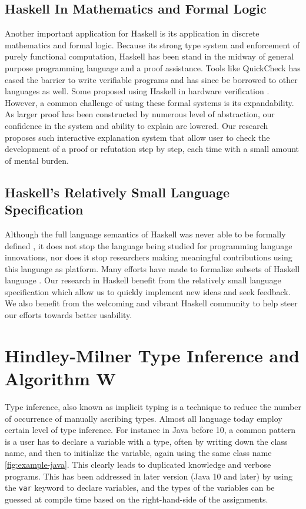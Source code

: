 \subsection{Haskell In Mathematics and Formal Logic}

Another important application for Haskell is its application in discrete mathematics and formal logic. Because its strong type system and enforcement of purely functional computation, Haskell has been stand in the midway of general purpose programming language and a proof assistance. Tools like QuickCheck \cite{Claessen2000-rl} has eased the barrier to write verifiable programs and has since be borrowed to other languages as well. Some proposed using Haskell in hardware verification \cite{Bjesse1998-lh}. However, a common challenge of using these formal systems is its expandability. As larger proof has been constructed by numerous level of abstraction, our confidence in the system and ability to explain are lowered. Our research proposes such interactive explanation system that allow user to check the development of a proof or refutation step by step, each time with a small amount of mental burden. 


\subsection{Haskell's Relatively Small Language Specification}

Although the full language semantics of Haskell was never able to be formally defined \cite{Hudak2007-kn}, it does not stop the language being studied for programming language innovations, nor does it stop researchers making meaningful contributions using this language as platform. Many efforts have made to formalize subsets of Haskell language \cite{FaxEn2002-nd}. Our research in Haskell benefit from the relatively small language specification which allow us to quickly implement new ideas and seek feedback.  We also benefit from the welcoming and vibrant Haskell community to help steer our efforts towards better usability. 




\section{Hindley-Milner Type Inference and Algorithm W}

Type inference, also known as implicit typing is a technique to reduce the number of occurrence of manually ascribing types. Almost all language today employ certain level of type inference. For instance in Java before 10, a common pattern is a user has to declare a variable with a type, often by writing down the class name, and then to initialize the variable, again using the same class name \ref{fig:example-java}. This clearly leads to duplicated knowledge and verbose programs. This has been addressed in later version (Java 10 and later) by using the \texttt{var} keyword \cite{noauthor_undated-an} to declare variables, and the types of the variables can be guessed at compile time based on the right-hand-side of the assignments.  

